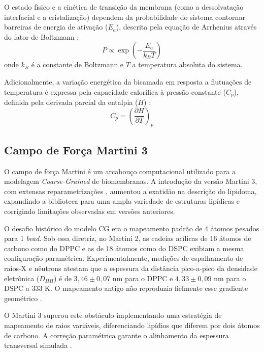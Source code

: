 O estado físico e a cinética de transição da membrana (como a dessolvatação interfacial e a cristalização) dependem da probabilidade do sistema contornar barreiras de energia de ativação ($E_a$), descrita pela equação de Arrhenius através do fator de Boltzmann \cite{peleg2012arrhenius}:
\begin{equation}
    P \propto \exp\left(-\frac{E_a}{k_B T}\right)
\end{equation}
onde $k_B$ é a constante de Boltzmann e $T$ a temperatura absoluta do sistema.

Adicionalmente, a variação energética da bicamada em resposta a flutuações de temperatura é expressa pela capacidade calorífica à pressão constante ($C_p$), definida pela derivada parcial da entalpia ($H$) \cite{hothar2024accurate}:
\begin{equation}
    C_p = \left(\frac{\partial H}{\partial T}\right)_p
\end{equation}

\subsection{Campo de Força Martini 3}

O campo de força Martini é um arcabouço computacional utilizado para a modelagem \textit{Coarse-Grained} de biomembranas. A introdução da versão Martini 3, com extensas reparametrizações \cite{pedersen2025}, aumentou a exatidão na descrição do lipidoma, expandindo a biblioteca para uma ampla variedade de estruturas lipídicas e corrigindo limitações observadas em versões anteriores.

O desafio histórico do modelo CG era o mapeamento padrão de 4 átomos pesados para 1 \textit{bead}. Sob essa diretriz, no Martini 2, as cadeias acílicas de 16 átomos de carbono como do DPPC e as de 18 átomos como do DSPC exibiam a mesma configuração paramétrica. Experimentalmente, medições de espalhamento de raios-X e nêutrons atestam que a espessura da distância pico-a-pico da densidade eletrônica ($D_{HH}$) é de $3,46 \pm 0,07$ nm para o DPPC e $4,33 \pm 0,09$ nm para o DSPC a 333 K. O mapeamento antigo não reproduzia fielmente esse gradiente geométrico \cite{pedersen2025}.

O Martini 3 superou este obstáculo implementando uma estratégia de mapeamento de raios variáveis, diferenciando lipídios que diferem por dois átomos de carbono. A correção paramétrica garante o alinhamento da espessura transversal simulada \cite{pedersen2025}.

